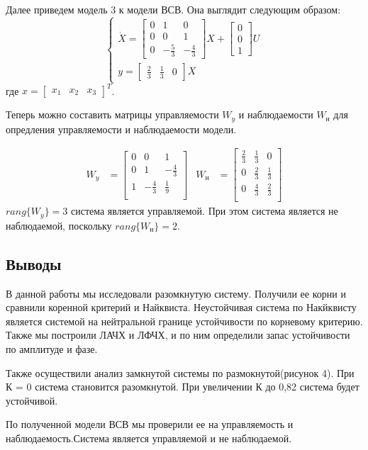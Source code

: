 \documentclass[a4paper, 12pt]{article}
\begin{document}
Далее приведем модель 3 к модели ВСВ. Она выглядит следующим образом:
\begin{equation}
\begin{cases}
\dot{X} = \begin{bmatrix}
0 & 1 & 0 \\
0 & 0 & 1 \\
0 & -\frac{5}{3} & -\frac{4}{3}
\end{bmatrix}X + \begin{bmatrix}
0 \\ 0 \\ 1
\end{bmatrix}U \\
y = \begin{bmatrix}\frac{2}{3} & \frac{1}{3} & 0\end{bmatrix} X
\end{cases}
\end{equation}
где $x = \begin{bmatrix} x_1 & x_2 & x_3 \end{bmatrix}^T$.
\newpage
\par
Теперь можно составить матрицы управляемости $W_y$ и наблюдаемости $W_\text{н}$ для опредления управляемости и наблюдаемости модели.

\begin{align*}
W_y & = \begin{bmatrix}
0 & 0 & 1 \\
0 & 1 & -\frac{4}{3} \\
1 & -\frac{4}{3} & \frac{1}{9} \\
\end{bmatrix} & 
W_\text{н} & = \begin{bmatrix}
\frac{2}{3} & \frac{1}{3} & 0 \\
0 & \frac{2}{3} & \frac{1}{3} \\
0 & \frac{4}{3} & \frac{2}{3} \\
\end{bmatrix}
\end{align*}
 $rang\{W_y\} = 3$ система является управляемой. При этом система является не наблюдаемой, поскольку $rang\{W_\text{н}\} = 2$.

\newpage
\begin{center}
	\section*{Выводы}
\end{center}

В данной работы мы исследовали разомкнутую систему. Получили ее корни и сравнили коренной критерий и Найквиста. Неустойчивая система по Накйквисту является системой на нейтральной границе устойчивости по корневому критерию. Также мы построили ЛАЧХ и ЛФЧХ, и по ним определили запас устойчивости по амплитуде и фазе. \par
Также осуществили анализ замкнутой системы по размокнутой(рисунок 4). При К = 0 система становится разомкнутой. При увеличении К до 0,82 система будет устойчивой. \par

По полученной модели ВСВ мы проверили ее на управляемость и наблюдаемость.Система является управляемой и не наблюдаемой.
\end{document}
